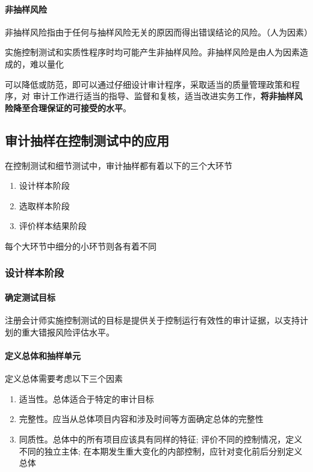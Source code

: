 \documentclass[UTF8,12pt]{ctexart}
\numberwithin{equation}{section} %
\numberwithin{figure}{section}
\numberwithin{table}{section}
\begin{document}
	\paragraph{非抽样风险}
	非抽样风险指由于任何与抽样风险无关的原因而得出错误结论的风险。（人为因素）
	
	实施控制测试和实质性程序时均可能产生非抽样风险。非抽样风险是由人为因素造成的，难以量化
	
	可以降低或防范，即可以通过仔细设计审计程序，采取适当的质量管理政策和程序，对 审计工作进行适当的指导、监督和复核，适当改进实务工作，\textbf{将非抽样风险降至合理保证的可接受的水平}。
	
	\subsection{审计抽样在控制测试中的应用}
	在控制测试和细节测试中，审计抽样都有着以下的三个大环节
	\begin{enumerate}
		\item 设计样本阶段
		
		\item 选取样本阶段
		
		\item 评价样本结果阶段
	\end{enumerate}
	每个大环节中细分的小环节则各有着不同
	
	\subsubsection{设计样本阶段}
	\paragraph{确定测试目标} 注册会计师实施控制测试的目标是提供关于控制运行有效性的审计证据，以支持计划的重大错报风险评估水平。
	
	\paragraph{定义总体和抽样单元}
	定义总体需要考虑以下三个因素
	\begin{enumerate}
		\item 适当性。总体适合于特定的审计目标
		
		\item 完整性。应当从总体项目内容和涉及时间等方面确定总体的完整性
		
		\item 同质性。总体中的所有项目应该具有同样的特征; 评价不同的控制情况，定义不同的独立主体; 在本期发生重大变化的内部控制，应针对变化前后分别定义总体
	\end{enumerate}
	
\end{document}

